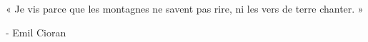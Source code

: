 \begin{comment}
\end{comment}

\chapter*{}
\vspace{-10pt}
\setlength{}
\setlength{}
\epigraph{« Je vis parce que les montagnes ne savent pas rire, ni les vers de terre chanter. »}{- Emil Cioran}